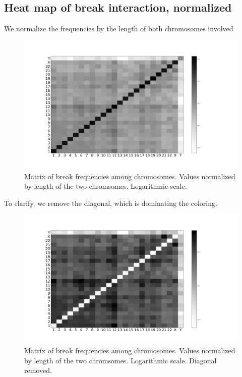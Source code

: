 \documentclass[a4paper,10pt]{article}
\begin{document}
\subsection*{Heat map of break interaction, normalized}

We normalize the frequencies by the length of both chromosomes involved

\begin{figure}[H]
\includegraphics[scale=0.24]{figures/Matrix_break_frequencies_normalized.pdf}
\caption{Matrix of break frequencies among chromosomes. Values normalized by length of the two chromsomes. Logarithmic scale.}
\end{figure}

To clarify, we remove the diagonal, which is dominating the coloring.

\begin{figure}[H]
\includegraphics[scale=0.24]{figures/Matrix_break_frequencies_normalized_nodiagonal.pdf}
\caption{Matrix of break frequencies among chromosomes. Values normalized by length of the two chromsomes. Logarithmic scale. Diagonal removed.}
\end{figure}
\end{document}
